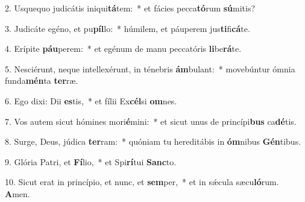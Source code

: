 2. Usquequo judicátis iniqui\textbf{tá}tem:~*  et fácies pecca\textbf{tó}rum \textbf{sú}mitis?\

3. Judicáte egéno, et pu\textbf{píl}lo:~*  húmilem, et páuperem jus\textbf{ti}fi\textbf{cá}te.\

4. Erípite \textbf{páu}perem:~*  et egénum de manu peccatóris \textbf{li}be\textbf{rá}te.\

5. Nesciérunt, neque intellexérunt, in ténebris \textbf{ám}bulant:~*  movebúntur ómnia funda\textbf{mén}ta \textbf{ter}ræ.\

6. Ego dixi: Dii \textbf{es}tis,~*  et fílii Ex\textbf{cél}si \textbf{om}nes.\

7. Vos autem sicut hómines mori\textbf{é}mini:~*  et sicut unus de princípi\textbf{bus} ca\textbf{dé}tis.\

8. Surge, Deus, júdica \textbf{ter}ram:~*  quóniam tu hereditábis in \textbf{óm}nibus \textbf{Gén}tibus.\

9. Glória Patri, et \textbf{Fí}lio,~*  et Spi\textbf{rí}tui \textbf{Sanc}to.\

10. Sicut erat in princípio, et nunc, et \textbf{sem}per,~*  et in sǽcula sæcu\textbf{ló}rum. \textbf{A}men.\

